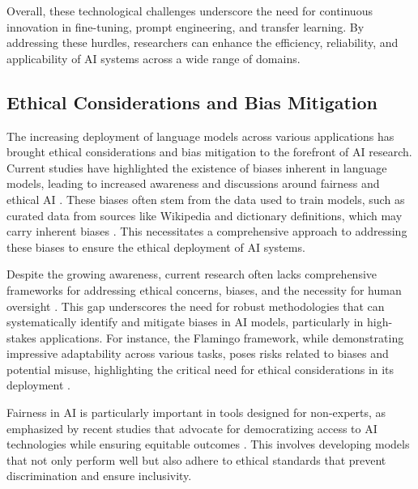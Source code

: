 Overall, these technological challenges underscore the need for continuous innovation in fine-tuning, prompt engineering, and transfer learning. By addressing these hurdles, researchers can enhance the efficiency, reliability, and applicability of AI systems across a wide range of domains.


\subsection{Ethical Considerations and Bias Mitigation} \label{subsec:Ethical Considerations and Bias Mitigation}



The increasing deployment of language models across various applications has brought ethical considerations and bias mitigation to the forefront of AI research. Current studies have highlighted the existence of biases inherent in language models, leading to increased awareness and discussions around fairness and ethical AI \cite{magee2021intersectionalbiascausallanguage}. These biases often stem from the data used to train models, such as curated data from sources like Wikipedia and dictionary definitions, which may carry inherent biases \cite{gao2023benefitslabeldescriptiontrainingzeroshot}. This necessitates a comprehensive approach to addressing these biases to ensure the ethical deployment of AI systems.



Despite the growing awareness, current research often lacks comprehensive frameworks for addressing ethical concerns, biases, and the necessity for human oversight \cite{kasneci2023chatgpt}. This gap underscores the need for robust methodologies that can systematically identify and mitigate biases in AI models, particularly in high-stakes applications. For instance, the Flamingo framework, while demonstrating impressive adaptability across various tasks, poses risks related to biases and potential misuse, highlighting the critical need for ethical considerations in its deployment \cite{alayrac2022flamingo}.



Fairness in AI is particularly important in tools designed for non-experts, as emphasized by recent studies that advocate for democratizing access to AI technologies while ensuring equitable outcomes \cite{narayanan2023democratizecareneedfairness}. This involves developing models that not only perform well but also adhere to ethical standards that prevent discrimination and ensure inclusivity.



